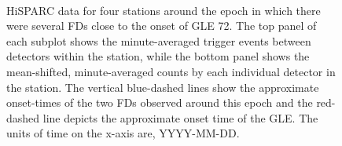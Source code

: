 \begin{figure}[ht]
	\centering
	 \\
	
	\qquad
	
	
	\caption{HiSPARC data for four stations around the epoch in which there were several FDs close to the onset of GLE 72. The top panel of each subplot shows the minute-averaged trigger events between detectors within the station, while the bottom panel shows the mean-shifted, minute-averaged counts by each individual detector in the station. The vertical blue-dashed lines show the approximate onset-times of the two FDs observed around this epoch and the red-dashed line depicts the approximate onset time of the GLE. The units of time on the x-axis are, YYYY-MM-DD.}
	\label{fig:FD_GLE72}
\end{figure}

